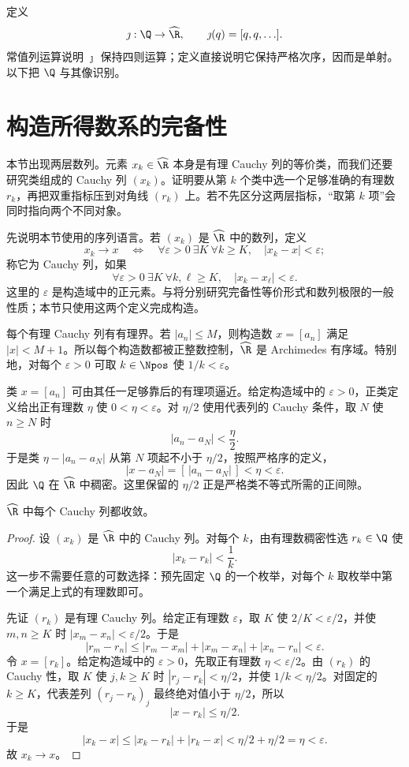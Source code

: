 定义
\[
 \jmath:\Q\to\widehat{\R},\qquad
 \jmath(q)=[q,q,\ldots].
\]
常值列运算说明 \(\jmath\) 保持四则运算；定义直接说明它保持严格次序，因而是单射。以下把 \(\Q\) 与其像识别。

\section{构造所得数系的完备性}

本节出现两层数列。元素 \(x_k\in\widehat{\R}\) 本身是有理 Cauchy 列的等价类，而我们还要研究类组成的 Cauchy 列 \((x_k)\)。证明要从第 \(k\) 个类中选一个足够准确的有理数 \(r_k\)，再把双重指标压到对角线 \((r_k)\) 上。若不先区分这两层指标，“取第 \(k\) 项”会同时指向两个不同对象。


先说明本节使用的序列语言。若 \((x_k)\) 是 \(\widehat{\R}\) 中的数列，定义
\[
 x_k\longrightarrow x
 \quad\Longleftrightarrow\quad
 \forall\varepsilon>0\ \exists K\ \forall k\ge K,
 \quad |x_k-x|<\varepsilon;
\]
称它为 Cauchy 列，如果
\[
 \forall\varepsilon>0\ \exists K\ \forall k,\ell\ge K,
 \quad |x_k-x_\ell|<\varepsilon.
\]
这里的 \(\varepsilon\) 是构造域中的正元素。与将分别研究完备性等价形式和数列极限的一般性质；本节只使用这两个定义完成构造。

每个有理 Cauchy 列有有理界。若 \(|a_n|\le M\)，则构造数 \(x=[a_n]\) 满足 \(|x|<M+1\)。所以每个构造数都被正整数控制，\(\widehat{\R}\) 是 Archimedes 有序域。特别地，对每个 \(\varepsilon>0\) 可取 \(k\in\Npos\) 使 \(1/k<\varepsilon\)。

类 \(x=[a_n]\) 可由其任一足够靠后的有理项逼近。给定构造域中的 \(\varepsilon>0\)，正类定义给出正有理数 \(\eta\) 使 \(0<\eta<\varepsilon\)。对 \(\eta/2\) 使用代表列的 Cauchy 条件，取 \(N\) 使 \(n\ge N\) 时
\[
 |a_n-a_N|<\frac{\eta}{2}.
\]
于是类 \(\eta-|a_n-a_N|\) 从第 \(N\) 项起不小于 \(\eta/2\)，按照严格序的定义，
\[
 |x-a_N|=[\,|a_n-a_N|\,]<\eta<\varepsilon.
\]
因此 \(\Q\) 在 \(\widehat{\R}\) 中稠密。这里保留的 \(\eta/2\) 正是严格类不等式所需的正间隙。

\begin{theorem}
\(\widehat{\R}\) 中每个 Cauchy 列都收敛。
\end{theorem}

\begin{proof}
设 \((x_k)\) 是 \(\widehat{\R}\) 中的 Cauchy 列。对每个 \(k\)，由有理数稠密性选 \(r_k\in\Q\) 使
\[
 |x_k-r_k|<\frac1k.
\]
这一步不需要任意的可数选择：预先固定 \(\Q\) 的一个枚举，对每个 \(k\) 取枚举中第一个满足上式的有理数即可。

先证 \((r_k)\) 是有理 Cauchy 列。给定正有理数 \(\varepsilon\)，取 \(K\) 使 \(2/K<\varepsilon/2\)，并使 \(m,n\ge K\) 时 \(|x_m-x_n|<\varepsilon/2\)。于是
\[
 |r_m-r_n|\le|r_m-x_m|+|x_m-x_n|+|x_n-r_n|<\varepsilon.
\]
令 \(x=[r_k]\)。给定构造域中的 \(\varepsilon>0\)，先取正有理数 \(\eta<\varepsilon/2\)。由 \((r_k)\) 的 Cauchy 性，取 \(K\) 使 \(j,k\ge K\) 时 \(|r_j-r_k|<\eta/2\)，并使 \(1/k<\eta/2\)。对固定的 \(k\ge K\)，代表差列 \((r_j-r_k)_j\) 最终绝对值小于 \(\eta/2\)，所以
\[
  |x-r_k|\le\eta/2.
\]
于是
\[
 |x_k-x|\le |x_k-r_k|+|r_k-x|
 <\eta/2+\eta/2=\eta<\varepsilon.
\]
故 \(x_k\to x\)。
\end{proof}

